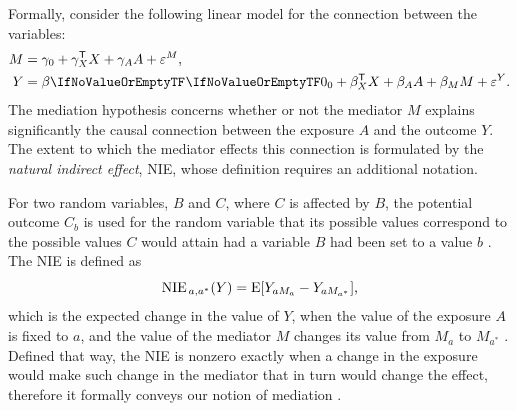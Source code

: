 \documentclass[ejs, twoside]{imsart}
\theoremstyle{plain}
\theoremstyle{remark}
\newcommand{\comma}{\text{,}}
\newcommand{\regerror}[1]{\varepsilon^{ \ifnum #1=1 M \else Y \fi}}
\newcommand{\transpose}[1]{#1^\mathsf{T} }
\numberwithin{equation}{section}
\numberwithin{table}{section}
\numberwithin{figure}{section}
\begin{document}
Formally, consider the following linear model for the connection between the variables:
\begin{equation} \label{eq:medregmodel}
	\begin{split}
		M &= \regcoefx{1}[0] + \transpose{\regcoefx{1}[X]} X + \regcoefx{1}[A] A + \regerror{1} \text{,} \\
		Y &= \regcoef{2}[][0] + \transpose{\regcoefx{2}[X]} X + \regcoefx{2}[A] A + \regcoefx{2}[M] M + \regerror{2} \text{.}
	\end{split}
\end{equation}
The mediation hypothesis concerns whether or not the mediator \(M\) explains significantly the causal connection between the exposure \(A\) and the outcome \(Y\). The extent to which the mediator effects this connection is formulated by the \emph{natural indirect effect}, NIE, whose definition requires an additional notation.

For two random variables, \(B\) and \(C\), where \(C\) is affected by \(B\), the potential outcome \(C_b\) is used for the random variable that its possible values correspond to the possible values \(C\) would attain had a variable \(B\) had been set to a value \(b\) \citep{pearl_direct_2001, pearl_causal_2009}. The NIE is defined as
\[\NIE = \mean{Y_{aM_a} - Y_{aM_{a^*}}} \comma \] 
which is the expected change in the value of \(Y\), when the value of the exposure \(A\) is fixed to \(a\), and the value of the mediator \(M\) changes its value from \(M_a\) to \(M_{a^*}\) \citep{robins_identifiability_1992, pearl_direct_2001,vanderweele_conceptual_2009}. Defined that way, the NIE is nonzero exactly when a change in the exposure would make such change in the mediator that in turn would change the effect, therefore it formally conveys our notion of mediation \citep{vanderweele_three-way_2013}.
\end{document}
